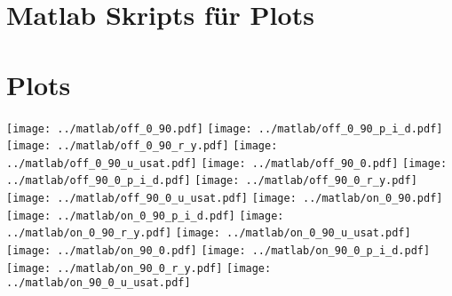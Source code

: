 \appendix
\section{Matlab Skripts für Plots}



\section{Plots}
\centering
\clearpage
\texttt{[image: ../matlab/off\_0\_90.pdf]}
\clearpage
\texttt{[image: ../matlab/off\_0\_90\_p\_i\_d.pdf]}
\clearpage
\texttt{[image: ../matlab/off\_0\_90\_r\_y.pdf]}
\clearpage
\texttt{[image: ../matlab/off\_0\_90\_u\_usat.pdf]}
\clearpage
\texttt{[image: ../matlab/off\_90\_0.pdf]}
\clearpage
\texttt{[image: ../matlab/off\_90\_0\_p\_i\_d.pdf]}
\clearpage
\texttt{[image: ../matlab/off\_90\_0\_r\_y.pdf]}
\clearpage
\texttt{[image: ../matlab/off\_90\_0\_u\_usat.pdf]}
\clearpage
\texttt{[image: ../matlab/on\_0\_90.pdf]}
\clearpage
\texttt{[image: ../matlab/on\_0\_90\_p\_i\_d.pdf]}
\clearpage
\texttt{[image: ../matlab/on\_0\_90\_r\_y.pdf]}
\clearpage
\texttt{[image: ../matlab/on\_0\_90\_u\_usat.pdf]}
\clearpage
\texttt{[image: ../matlab/on\_90\_0.pdf]}
\clearpage
\texttt{[image: ../matlab/on\_90\_0\_p\_i\_d.pdf]}
\clearpage
\texttt{[image: ../matlab/on\_90\_0\_r\_y.pdf]}
\clearpage
\texttt{[image: ../matlab/on\_90\_0\_u\_usat.pdf]}


